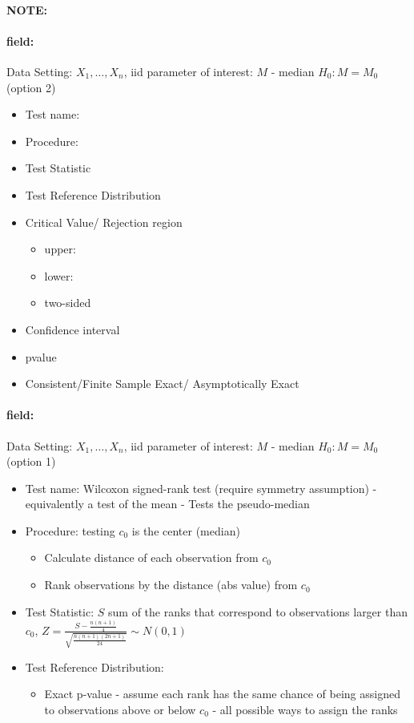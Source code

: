 \documentclass[12pt]{article}
\newenvironment{note}{\paragraph{NOTE:}}{}
\newenvironment{field}{\paragraph{field:}}{}
\begin{document}
\begin{note}
 \begin{field}
  Data Setting: $X_1, \ldots, X_n$, iid parameter of interest: $M$ - median $H_0: M = M_0$ (option 2)
  \begin{itemize}
   \item Test name:
   \item Procedure:
   \item Test Statistic
   \item Test Reference Distribution
   \item Critical Value/ Rejection region
         \begin{itemize}
          \item upper:
          \item lower:
          \item two-sided
         \end{itemize}
   \item Confidence interval
   \item pvalue
   \item Consistent/Finite Sample Exact/ Asymptotically Exact
  \end{itemize}
 \end{field}
 \begin{field}
  Data Setting: $X_1, \ldots, X_n$, iid parameter of interest: $M$ - median $H_0: M = M_0$ (option 1)
  \begin{itemize}
   \item Test name: Wilcoxon signed-rank test (require symmetry assumption) - equivalently a test of the mean - Tests the pseudo-median
   \item Procedure: testing $c_0$ is the center (median)
         \begin{itemize}
          \item Calculate distance of each observation from $c_0$
          \item Rank observations by the distance (abs value) from $c_0$
         \end{itemize}
   \item Test Statistic: $S$ sum of the ranks that correspond to observations larger than $c_0$, $Z = \frac{S - \frac{n(n+1)}{4}}{\sqrt{\frac{n(n+1)(2n+1)}{24}}} \sim N(0,1)$
   \item Test Reference Distribution:
         \begin{itemize}
          \item Exact p-value - assume each rank has the same chance of being assigned to observations above or below $c_0$ - all possible ways to assign the ranks

\end{itemize}
\end{itemize}
\end{field}
\end{note}
\end{document}

